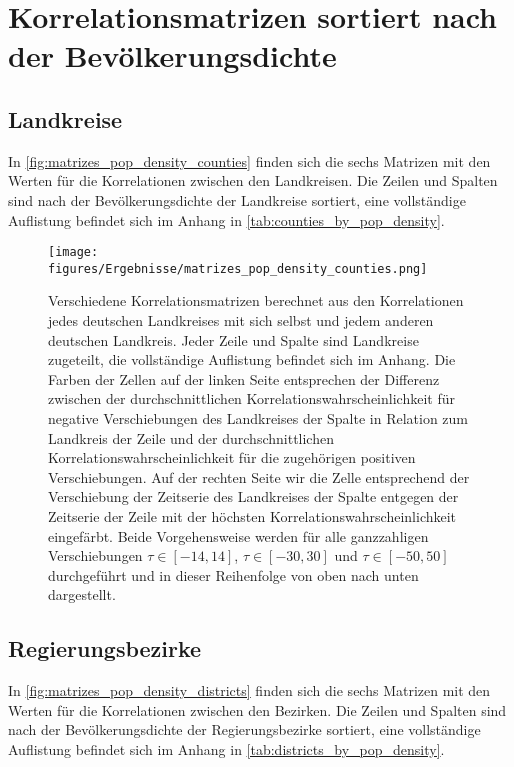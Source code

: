 \section{Korrelationsmatrizen sortiert nach der Bevölkerungsdichte}
\subsection{Landkreise}
In \autoref{fig:matrizes_pop_density_counties} finden sich die sechs Matrizen mit den Werten für die Korrelationen zwischen den Landkreisen. Die Zeilen und Spalten sind nach der Bevölkerungsdichte der Landkreise sortiert, eine vollständige Auflistung befindet sich im Anhang in \autoref{tab:counties_by_pop_density}.
\begin{figure}[H]
    \centering
    \texttt{[image: figures/Ergebnisse/matrizes\_pop\_density\_counties.png]}
    \caption{Verschiedene Korrelationsmatrizen berechnet aus den Korrelationen jedes deutschen Landkreises mit sich selbst und jedem anderen deutschen Landkreis. Jeder Zeile und Spalte sind Landkreise zugeteilt, die vollständige Auflistung befindet sich im Anhang. Die Farben der Zellen auf der linken Seite entsprechen der Differenz zwischen der durchschnittlichen Korrelationswahrscheinlichkeit für negative Verschiebungen des Landkreises der Spalte in Relation zum Landkreis der Zeile und der durchschnittlichen Korrelationswahrscheinlichkeit für die zugehörigen positiven Verschiebungen.
    Auf der rechten Seite wir die Zelle entsprechend der Verschiebung der Zeitserie des Landkreises der Spalte entgegen der Zeitserie der Zeile mit der höchsten Korrelationswahrscheinlichkeit eingefärbt. Beide Vorgehensweise werden für alle ganzzahligen Verschiebungen $\tau\in[-14,14]$,  $\tau\in[-30,30]$ und  $\tau\in[-50,50]$ durchgeführt und in dieser Reihenfolge von oben nach unten dargestellt.}
    \label{fig:matrizes_pop_density_counties}
\end{figure}


\subsection{Regierungsbezirke}
In \autoref{fig:matrizes_pop_density_districts} finden sich die sechs Matrizen mit den Werten für die Korrelationen zwischen den Bezirken. Die Zeilen und Spalten sind nach der Bevölkerungsdichte der Regierungsbezirke sortiert, eine vollständige Auflistung befindet sich im Anhang in \autoref{tab:districts_by_pop_density}.

